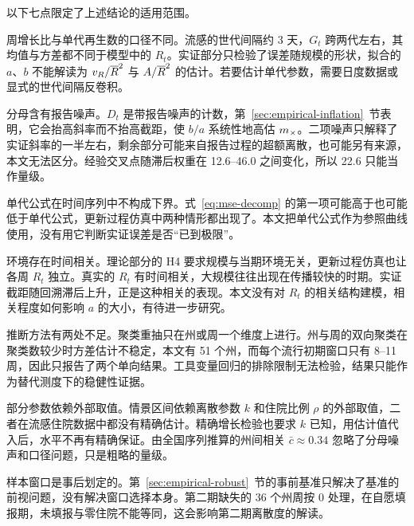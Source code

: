以下七点限定了上述结论的适用范围。

周增长比与单代再生数的口径不同。流感的世代间隔约 3 天，$G_t$ 跨两代左右，其均值与方差都不同于模型中的 $R_t$。实证部分只检验了误差随规模的形状，拟合的 $a$、$b$ 不能解读为 $v_R/\overline{R}^2$ 与 $A/\overline{R}^2$ 的估计。若要估计单代参数，需要日度数据或显式的世代间隔反卷积。

分母含有报告噪声。$D_t$ 是带报告噪声的计数，第~\ref{sec:empirical-inflation}~节表明，它会抬高斜率而不抬高截距，使 $b/a$ 系统性地高估 $m_{\times}$。二项噪声只解释了实证斜率的一半左右，剩余部分可能来自报告过程的超额离散，也可能另有来源，本文无法区分。经验交叉点随滞后权重在 12.6--46.0 之间变化，所以 22.6 只能当作量级。

单代公式在时间序列中不构成下界。式~\eqref{eq:mse-decomp} 的第一项可能高于也可能低于单代公式，更新过程仿真中两种情形都出现了。本文把单代公式作为参照曲线使用，没有用它判断实证误差是否“已到极限”。

环境存在时间相关。理论部分的 H4 要求规模与当期环境无关，更新过程仿真也让各周 $R_t$ 独立。真实的 $R_t$ 有时间相关，大规模往往出现在传播较快的时期。实证截距随回溯滞后上升，正是这种相关的表现。本文没有对 $R_t$ 的相关结构建模，相关程度如何影响 $a$ 的大小，有待进一步研究。

推断方法有两处不足。聚类重抽只在州或周一个维度上进行。州与周的双向聚类在聚类数较少时方差估计不稳定\citep{cameron2011robust, cameron2015practitioner}，本文有 51 个州，而每个流行初期窗口只有 8--11 周，因此只报告了两个单向结果。工具变量回归的排除限制无法检验，结果只能作为替代测度下的稳健性证据。

部分参数依赖外部取值。情景区间依赖离散参数 $k$ 和住院比例 $\rho$ 的外部取值，二者在流感住院数据中都没有精确估计。精确增长检验也要求 $k$ 已知，用估计值代入后，水平不再有精确保证。由全国序列推算的州间相关 $\bar c\approx0.34$ 忽略了分母噪声和口径问题，只是粗略的量级。

样本窗口是事后划定的。第~\ref{sec:empirical-robust}~节的事前基准只解决了基准的前视问题，没有解决窗口选择本身。第二期缺失的 36 个州周按 0 处理，在自愿填报期，未填报与零住院不能等同，这会影响第二期离散度的解读。
